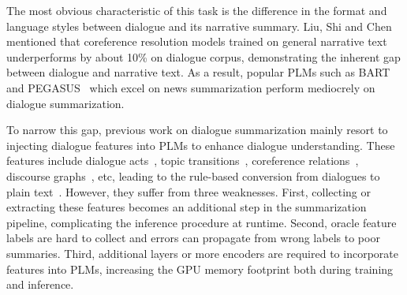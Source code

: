 The most obvious characteristic of this task is the difference in the format and language styles 
between dialogue and its narrative summary.
Liu, Shi and Chen~ mentioned
that coreference resolution models trained on general narrative text 
underperforms by about 10\% on dialogue corpus, 
demonstrating the inherent gap between dialogue and narrative text. 
As a result, popular PLMs such as BART~\cite{lewis2020bart} and 
PEGASUS~\cite{zhang2020pegasus} which excel on news summarization 
perform mediocrely on dialogue summarization.

To narrow this gap, previous work on dialogue summarization mainly 
resort to injecting dialogue features into PLMs to enhance dialogue 
understanding. These features include dialogue acts~\cite{goo2018abstractive}, topic transitions~\cite{chen2020multi}, coreference relations~\cite{liu2021coreference}, discourse graphs~\cite{chen2021structure}, etc, leading to the rule-based
conversion from dialogues to plain text~\cite{ganesh2019restructuring}.
However, they suffer from three weaknesses. 
First, collecting or extracting these features becomes an additional step
in the summarization pipeline, complicating the inference procedure 
at runtime. 
Second, oracle feature labels are hard to collect and 
errors can propagate from wrong labels to poor summaries.
Third, additional layers or more encoders are required to incorporate 
features into PLMs, increasing the GPU memory footprint both during 
training and inference.


